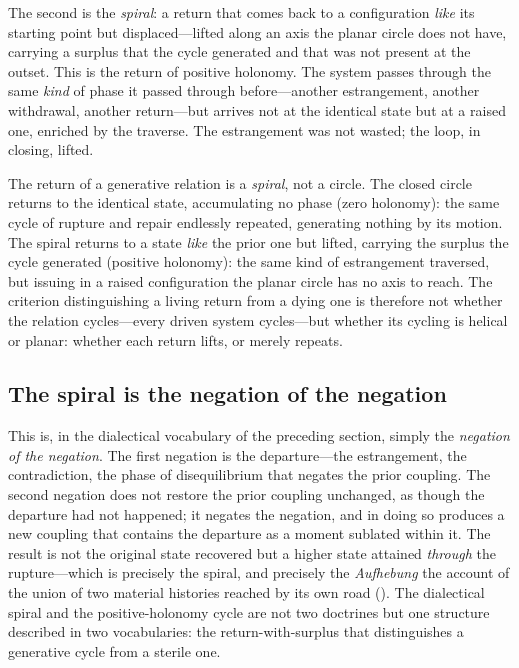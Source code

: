 The second is the \emph{spiral}: a return that comes back to a configuration \emph{like} its starting point but displaced---lifted along an axis the planar circle does not have, carrying a surplus that the cycle generated and that was not present at the outset. This is the return of positive holonomy. The system passes through the same \emph{kind} of phase it passed through before---another estrangement, another withdrawal, another return---but arrives not at the identical state but at a raised one, enriched by the traverse. The estrangement was not wasted; the loop, in closing, lifted.

\begin{claim}
The return of a generative relation is a \emph{spiral}, not a circle. The closed circle returns to the identical state, accumulating no phase (zero holonomy): the same cycle of rupture and repair endlessly repeated, generating nothing by its motion. The spiral returns to a state \emph{like} the prior one but lifted, carrying the surplus the cycle generated (positive holonomy): the same kind of estrangement traversed, but issuing in a raised configuration the planar circle has no axis to reach. The criterion distinguishing a living return from a dying one is therefore not whether the relation cycles---every driven system cycles---but whether its cycling is helical or planar: whether each return lifts, or merely repeats.
\end{claim}

\subsection{The spiral is the negation of the negation}
\label{p17:sub:return-dialectic}

This is, in the dialectical vocabulary of the preceding section, simply the \emph{negation of the negation}. The first negation is the departure---the estrangement, the contradiction, the phase of disequilibrium that negates the prior coupling. The second negation does not restore the prior coupling unchanged, as though the departure had not happened; it negates the negation, and in doing so produces a new coupling that contains the departure as a moment sublated within it. The result is not the original state recovered but a higher state attained \emph{through} the rupture---which is precisely the spiral, and precisely the \emph{Aufhebung} the account of the union of two material histories reached by its own road (). The dialectical spiral and the positive-holonomy cycle are not two doctrines but one structure described in two vocabularies: the return-with-surplus that distinguishes a generative cycle from a sterile one.

